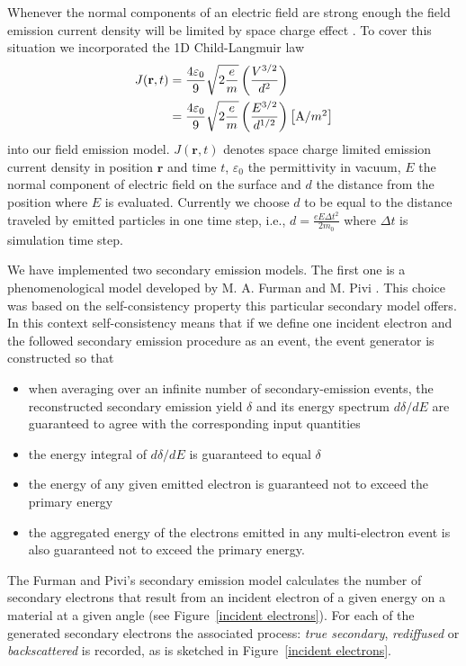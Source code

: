 \documentclass[aps,prstab,superscriptaddress,showpacs]{revtex4-1}
\begin{document}
Whenever the normal components of an electric field are strong enough the field
emission current density will be limited by space charge effect \cite{Feng}. 
To cover this situation we incorporated the 1D Child-Langmuir law
%
\begin{align}\label{eq:SpaceCharge}
    J(\mathbf{r},t) & =\frac{4\varepsilon_0}{9}\sqrt{2\frac{e}{m}}\left(\frac{V^{3/2}}{d^2}\right)\notag\\
    &
    =\frac{4\varepsilon_0}{9}\sqrt{2\frac{e}{m}}\left(\frac{E^{3/2}}{d^{1/2}}\right)
    \left[\hbox{A/$m^2$}\right]
\end{align}
%
into our field emission model. $J(\mathbf{r},t)$ denotes space charge limited emission 
current density in position $\mathbf{r}$ and time $t$, $\varepsilon_0$ the
permittivity in vacuum, $E$ the normal component of electric field on the surface
and $d$ the distance from the position where $E$ is evaluated. Currently we 
choose $d$ to be equal to the distance traveled by emitted particles in one
time step, i.e., $d=\frac{\displaystyle eE\Delta{t}^2}{\displaystyle 2m_0}$ where $\Delta{t}$ is simulation
time step.

We have implemented two secondary emission models. The first one is a
phenomenological model developed by M. A. Furman and M. Pivi \cite{Furman-Pivi}. This
choice was based on the self-consistency property this particular secondary
model offers. In this context self-consistency means that if we define one incident
electron and the followed secondary emission procedure as an event, the event
generator is constructed so that
%
\begin{itemize}
    \item when averaging over an infinite number of secondary-emission events, 
    the reconstructed secondary emission yield $\delta$ and its energy spectrum
    $ d\delta/dE$ are guaranteed to agree with the corresponding input quantities 
    \item the energy integral of $d\delta/dE$ is guaranteed to equal $\delta$
    \item the energy of any given emitted electron is guaranteed not to exceed the 
    primary energy
    \item the aggregated energy of the electrons emitted in any multi-electron event 
    is also guaranteed not to exceed the primary energy.
\end{itemize}
The Furman and Pivi's secondary emission model calculates the number of secondary electrons that result from an incident electron of a given energy on a material at a given angle (see Figure~\ref{incident electrons}). For each of the generated secondary electrons the associated process: {\em true secondary}, {\em rediffused} or {\em backscattered} is recorded, as is sketched in Figure~\ref{incident electrons}.  
\end{document}
